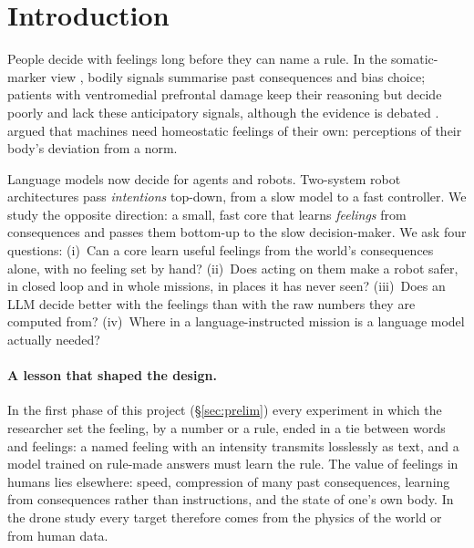 \documentclass[10pt]{article}
\begin{document}
\section{Introduction}
People decide with feelings long before they can name a rule. In the somatic-marker view \citep{damasio1994,bechara1994,bechara1997},
bodily signals summarise past consequences and bias choice; patients with ventromedial prefrontal damage keep their reasoning but
decide poorly and lack these anticipatory signals, although the evidence is debated \citep{dunn2006}. \citet{man2019} argued that
machines need homeostatic feelings of their own: perceptions of their body's deviation from a norm.

Language models now decide for agents and robots. Two-system robot architectures \citep{lin2023swiftsage,gr00t2025,helix2025}
pass \emph{intentions} top-down, from a slow model to a fast controller. We study the opposite direction: a small, fast core that
learns \emph{feelings} from consequences and passes them bottom-up to the slow decision-maker. We ask four questions:
(i)~Can a core learn useful feelings from the world's consequences alone, with no feeling set by hand?
(ii)~Does acting on them make a robot safer, in closed loop and in whole missions, in places it has never seen?
(iii)~Does an LLM decide better with the feelings than with the raw numbers they are computed from?
(iv)~Where in a language-instructed mission is a language model actually needed?

\paragraph{A lesson that shaped the design.} In the first phase of this project (\S\ref{sec:prelim}) every experiment in which
the researcher set the feeling, by a number or a rule, ended in a tie between words and feelings: a named feeling with an
intensity transmits losslessly as text, and a model trained on rule-made answers must learn the rule. The value of feelings in
humans lies elsewhere: speed, compression of many past consequences, learning from consequences rather than instructions, and
the state of one's own body. In the drone study every target therefore comes from the physics of the world or from human data.
\end{document}
